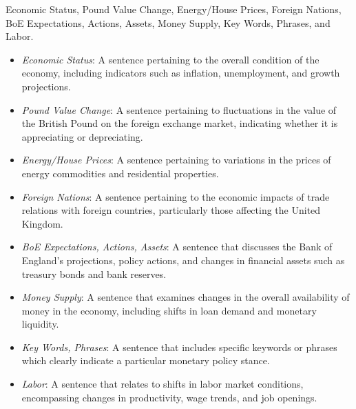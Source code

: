  Economic Status, Pound Value Change, Energy/House Prices, Foreign Nations, BoE Expectations, Actions, Assets, Money Supply, Key Words, Phrases, and Labor.

\begin{itemize}
    \item \emph{Economic Status}: A sentence pertaining to the overall condition of the economy, including indicators such as inflation, unemployment, and growth projections.
    \item \emph{Pound Value Change}: A sentence pertaining to fluctuations in the value of the British Pound on the foreign exchange market, indicating whether it is appreciating or depreciating.
    \item \emph{Energy/House Prices}: A sentence pertaining to variations in the prices of energy commodities and residential properties.
    \item \emph{Foreign Nations}: A sentence pertaining to the economic impacts of trade relations with foreign countries, particularly those affecting the United Kingdom.
    \item \emph{BoE Expectations, Actions, Assets}: A sentence that discusses the Bank of England’s projections, policy actions, and changes in financial assets such as treasury bonds and bank reserves.
    \item \emph{Money Supply}: A sentence that examines changes in the overall availability of money in the economy, including shifts in loan demand and monetary liquidity.
    \item \emph{Key Words, Phrases}: A sentence that includes specific keywords or phrases which clearly indicate a particular monetary policy stance.
    \item \emph{Labor}: A sentence that relates to shifts in labor market conditions, encompassing changes in productivity, wage trends, and job openings.
\end{itemize}

